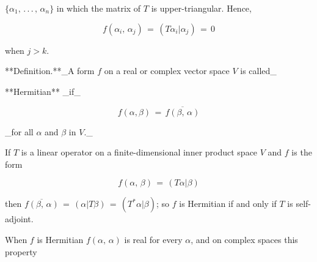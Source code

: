 \(\{\alpha_{1},\,.\,.\,.\,,\,\alpha_{n}\}\) in which the matrix of \(T\) is upper-triangular. Hence,

\[f(\alpha_{i},\,\alpha_{j})\,=\,(T\alpha_{i}|\alpha_{j})\,=\,0\]

when \(j>k\).

**Definition.**_A form \(f\) on a real or complex vector space \(V\) is called_

**Hermitian** _if_

\[f(\alpha,\beta)\,=\,\overline{f(\beta,\,\alpha)}\]

_for all \(\alpha\) and \(\beta\) in \(V\)._

If \(T\) is a linear operator on a finite-dimensional inner product space \(V\) and \(f\) is the form

\[f(\alpha,\,\beta)\,=\,(T\alpha|\beta)\]

then \(\overline{f(\beta,\,\alpha)}\,=\,(\alpha|T\beta)\,=\,(T^{*}\alpha|\beta)\); so \(f\) is Hermitian if and only if \(T\) is self-adjoint.

When \(f\) is Hermitian \(f(\alpha,\,\alpha)\) is real for every \(\alpha\), and on complex spaces this property 
